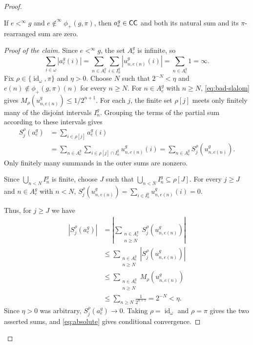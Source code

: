 \begin{proof}
\begin{claim}
If $e<^\infty g$ and $e\notin^\infty\phi_+(g,\pi)$, then
$a_e^g\in\mathsf{CC}$ and both its natural sum and its $\pi$-rearranged sum
are zero.
\end{claim}

\begin{proof}[Proof of the claim]
Since $e<^\infty g$, the set $A_e^g$ is infinite, so
\begin{equation}\label{eq:absolute}
 \sum_{i\in \omega}|a_e^g(i)|
 =\sum_{n\in A_e^g}\sum_{i\in I_n^g}|u_{n,e(n)}^g(i)|
 =\sum_{n\in A_e^g}1=\infty.
\end{equation}
Fix $\rho\in\{\operatorname{id}_\omega,\pi\}$ and $\eta>0$.
Choose $N$ such that $2^{-N}<\eta$ and
$e(n)\notin\phi_+(g,\pi)(n)$ for every $n\geq N$.
For $n\in A_e^g$ with $n\geq N$, \eqref{eq:bad-slalom} gives
$M_\rho(u_{n,e(n)}^g)\leq1/2^{n+1}$.
For each $j$, the finite set $\rho[j]$ meets only finitely many of
the disjoint intervals $I_n^g$. Grouping the terms of the partial sum
according to these intervals gives
\[
\begin{aligned}
 S_j^\rho(a_e^g)
 &=\sum_{i\in\rho[j]}a_e^g(i)\\
 &=\sum_{n\in A_e^g}\sum_{i\in\rho[j]\cap I_n^g}u_{n,e(n)}^g(i)
 =\sum_{n\in A_e^g}S_j^\rho(u_{n,e(n)}^g).
\end{aligned}
\]
Only finitely many summands in the outer sums are nonzero.

Since $\bigcup_{n<N}I_n^g$ is finite, choose $J$ such that
$\bigcup_{n<N}I_n^g\subseteq\rho[J]$.
For every $j\geq J$ and $n\in A_e^g$ with $n<N$,
$S_j^\rho(u_{n,e(n)}^g)=\sum_{i\in I_n^g}u_{n,e(n)}^g(i)=0$.


Thus, for $j\geq J$ we have
\[
\begin{aligned}
 |S_j^\rho(a_e^g)|
 &=\left|\sum_{\substack{n\in A_e^g\\n\geq N}}
                  S_j^\rho(u_{n,e(n)}^g)\right|\\
 &\leq\sum_{\substack{n\in A_e^g\\n\geq N}}
                   |S_j^\rho(u_{n,e(n)}^g)|\\
 &\leq\sum_{\substack{n\in A_e^g\\n\geq N}}M_\rho(u_{n,e(n)}^g)\\
 &\leq\sum_{n\geq N}\frac1{2^{n+1}}=2^{-N}<\eta.
\end{aligned}
\]
Since $\eta>0$ was arbitrary, $S_j^\rho(a_e^g)\to0$.
Taking $\rho=\operatorname{id}_\omega$ and $\rho=\pi$ gives the two
asserted sums, and \eqref{eq:absolute} gives conditional convergence.
\end{proof}


\end{proof}
